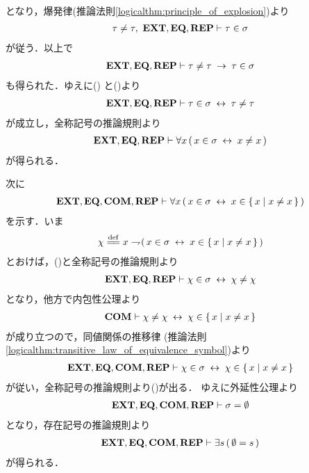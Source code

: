 \begin{sketch}
\begin{align}
		\end{align}
		となり，爆発律(推論法則\ref{logicalthm:principle_of_explosion})より
		\begin{align}
			\tau \neq \tau,\ \mbox{{\bf EXT}},\mbox{{\bf EQ}},\mbox{{\bf REP}} \vdash \tau \in \sigma
		\end{align}
		が従う．以上で
		\begin{align}
			\mbox{{\bf EXT}},\mbox{{\bf EQ}},\mbox{{\bf REP}} \vdash \tau \neq \tau \hspace{0.25em}\rightarrow\hspace{0.25em} \tau \in \sigma
			\label{fom:thm_emptyset_is_a_set_4}
		\end{align}
		も得られた．ゆえに()
		と()より
		\begin{align}
			\mbox{{\bf EXT}},\mbox{{\bf EQ}},\mbox{{\bf REP}} \vdash \tau \in \sigma \hspace{0.25em}\leftrightarrow\hspace{0.25em} \tau \neq \tau
		\end{align}
		が成立し，全称記号の推論規則より
		\begin{align}
			\mbox{{\bf EXT}},\mbox{{\bf EQ}},\mbox{{\bf REP}} \vdash 
			\forall x\, (\, x \in \sigma \hspace{0.25em}\leftrightarrow\hspace{0.25em} x \neq x\, )
			\label{fom:thm_emptyset_is_a_set_6}
		\end{align}
		が得られる．
		
		次に
		\begin{align}
			\mbox{{\bf EXT}},\mbox{{\bf EQ}},\mbox{\bf COM},\mbox{{\bf REP}} \vdash
			\forall x\, (\, x \in \sigma \hspace{0.25em}\leftrightarrow\hspace{0.25em} x \in \left\{\, x \mid x \neq x\, \right\}\, )
			\label{fom:thm_emptyset_is_a_set_5}
		\end{align}
		を示す．いま
		\begin{align}
			\chi \defeq x \negation (\, x \in \sigma \lrarrow x \in \Set{x}{x \neq x}\, )
		\end{align}
		とおけば，()と全称記号の推論規則より
		\begin{align}
			\mbox{{\bf EXT}},\mbox{{\bf EQ}},\mbox{{\bf REP}} \vdash \chi \in \sigma \hspace{0.25em}\leftrightarrow\hspace{0.25em} \chi \neq \chi
		\end{align}
		となり，他方で内包性公理より
		\begin{align}
			\mbox{\bf COM} \vdash \chi \neq \chi \hspace{0.25em}\leftrightarrow\hspace{0.25em} \chi \in \left\{\, x \mid x \neq x\, \right\}
		\end{align}
		が成り立つので，同値関係の推移律
		(推論法則\ref{logicalthm:transitive_law_of_equivalence_symbol})より
		\begin{align}
			\mbox{{\bf EXT}},\mbox{{\bf EQ}},\mbox{\bf COM},\mbox{{\bf REP}} \vdash
			\chi \in \sigma \hspace{0.25em}\leftrightarrow\hspace{0.25em} \chi \in \left\{\, x \mid x \neq x\, \right\}
		\end{align}
		が従い，全称記号の推論規則より()が出る．
		ゆえに外延性公理より
		\begin{align}
			\mbox{{\bf EXT}},\mbox{{\bf EQ}},\mbox{\bf COM},\mbox{{\bf REP}} \vdash \sigma = \emptyset
		\end{align}
		となり，存在記号の推論規則より
		\begin{align}
			\mbox{{\bf EXT}},\mbox{{\bf EQ}},\mbox{\bf COM},\mbox{{\bf REP}} \vdash \exists s\, (\, \emptyset = s\, )
		\end{align}
		が得られる．
		\QED
	\end{sketch}
	
